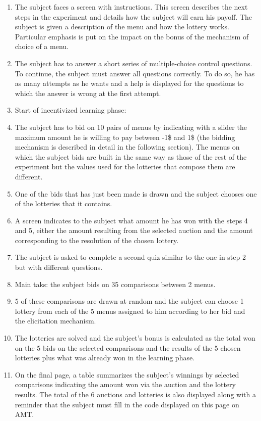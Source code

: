 \documentclass[
]{book}
\providecommand{\tightlist}{%
  \setlength{\itemsep}{0pt}\setlength{\parskip}{0pt}}
\begin{document}
\begin{enumerate}
\def\labelenumi{\arabic{enumi}.}
\tightlist
\item
  The subject faces a screen with instructions.
  This screen describes the next steps in the experiment and details how the
  subject will earn his payoff.
  The subject is given a description of the menu and how the lottery works.
  Particular emphasis is put on the impact on the bonus of the mechanism of choice
  of a menu.
\item
  The subject has to answer a short series of multiple-choice control questions.
  To continue, the subject must answer all questions correctly.
  To do so, he has as many attempts as he wants and a help is displayed for the
  questions to which the answer is wrong at the first attempt.
\item
  Start of incentivized learning phase:
\item
  The subject has to bid on 10 pairs of menus by indicating with a slider the
  maximum amount he is willing to pay between -1\$ and 1\$ (the bidding mechanism
  is described in detail in the following section).
  The menus on which the subject bids are built in the same way as those of the
  rest of the experiment but the values used for the lotteries that compose them
  are different.
\item
  One of the bids that has just been made is drawn and the subject chooses one
  of the lotteries that it contains.
\item
  A screen indicates to the subject what amount he has won with the steps 4 and
  5, either the amount resulting from the selected auction and the amount
  corresponding to the resolution of the chosen lottery.
\item
  The subject is asked to complete a second quiz similar to the one in step 2
  but with different questions.
\item
  Main taks: the subject bids on 35 comparisons between 2 menus.
\item
  5 of these comparisons are drawn at random and the subject can choose 1
  lottery from each of the 5 menus assigned to him according to her bid and the elicitation mechanism.
\item
  The lotteries are solved and the subject's bonus is calculated as the total
  won on the 5 bids on the selected comparisons and the results of the 5 chosen
  lotteries plus what was already won in the learning phase.
\item
  On the final page, a table summarizes the subject's winnings by selected
  comparisons indicating the amount won via the auction and the lottery results.
  The total of the 6 auctions and lotteries is also displayed along with a
  reminder that the subject must fill in the code displayed on this page on AMT.
\end{enumerate}
\end{document}
